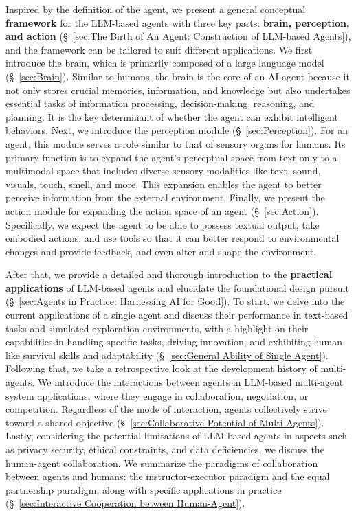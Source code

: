 \documentclass{article}
\begin{document}
Inspired by the definition of the agent, we present a general conceptual \textbf{framework} for the LLM-based agents with three key parts: \textbf{brain, perception, and action} (\S \ \ref{sec:The Birth of An Agent: Construction of LLM-based Agents}), and the framework can be tailored to suit different applications.
We first introduce the brain, which is primarily composed of a large language model  (\S \ \ref{sec:Brain}).
Similar to humans, the brain is the core of an AI agent because it not only stores crucial memories, information, and knowledge but also undertakes essential tasks of information processing, decision-making, reasoning, and planning. It is the key determinant of whether the agent can exhibit intelligent behaviors.
Next, we introduce the perception module (\S \ \ref{sec:Perception}). For an agent, this module serves a role similar to that of sensory organs for humans. Its primary function is to expand the agent's perceptual space from text-only to a multimodal space that includes diverse sensory modalities like text, sound, visuals, touch, smell, and more. This expansion enables the agent to better perceive information from the external environment.
Finally, we present the action module for expanding the action space of an agent (\S \ \ref{sec:Action}). Specifically, we expect the agent to be able to possess textual output, take embodied actions, and use tools so that it can better respond to environmental changes and provide feedback, and even alter and shape the environment.


After that, we provide a detailed and thorough introduction to the \textbf{practical applications} of LLM-based agents and elucidate the foundational design pursuit (\S \ \ref{sec:Agents in Practice:  Harnessing AI for Good}).
To start, we delve into the current applications of a single agent and discuss their performance in text-based tasks and simulated exploration environments, with a highlight on their capabilities in handling specific tasks, driving innovation, and exhibiting human-like survival skills and adaptability (\S \ \ref{sec:General Ability of Single Agent}).
Following that, we take a retrospective look at the development history of multi-agents. We introduce the interactions between agents in LLM-based multi-agent system applications, where they engage in collaboration, negotiation, or competition. Regardless of the mode of interaction, agents collectively strive toward a shared objective (\S \ \ref{sec:Collaborative Potential of Multi Agents}).
Lastly, considering the potential limitations of LLM-based agents in aspects such as privacy security, ethical constraints, and data deficiencies, we discuss the human-agent collaboration. We summarize the paradigms of collaboration between agents and humans: the instructor-executor paradigm and the equal partnership paradigm, along with specific applications in practice (\S \ \ref{sec:Interactive Cooperation between Human-Agent}).
\end{document}
